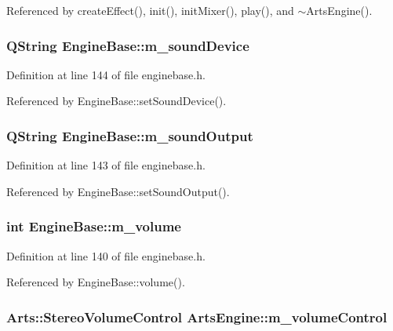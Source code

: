 Referenced by create\-Effect(), init(), init\-Mixer(), play(), and $\sim$Arts\-Engine().
\subsubsection{\setlength{\rightskip}{0pt plus 5cm}QString {\bf Engine\-Base::m\_\-sound\-Device}\hspace{0.3cm}{\tt  [protected, inherited]}}\label{classEngineBase_EngineBasep5}




Definition at line 144 of file enginebase.h.

Referenced by Engine\-Base::set\-Sound\-Device().
\subsubsection{\setlength{\rightskip}{0pt plus 5cm}QString {\bf Engine\-Base::m\_\-sound\-Output}\hspace{0.3cm}{\tt  [protected, inherited]}}\label{classEngineBase_EngineBasep4}




Definition at line 143 of file enginebase.h.

Referenced by Engine\-Base::set\-Sound\-Output().
\subsubsection{\setlength{\rightskip}{0pt plus 5cm}int {\bf Engine\-Base::m\_\-volume}\hspace{0.3cm}{\tt  [protected, inherited]}}\label{classEngineBase_EngineBasep1}




Definition at line 140 of file enginebase.h.

Referenced by Engine\-Base::volume().
\subsubsection{\setlength{\rightskip}{0pt plus 5cm}Arts::Stereo\-Volume\-Control {\bf Arts\-Engine::m\_\-volume\-Control}\hspace{0.3cm}{\tt  [private]}}\label{classArtsEngine_ArtsEnginer6}





